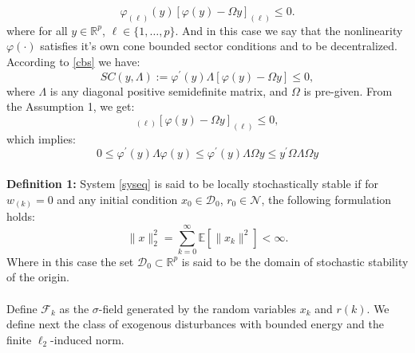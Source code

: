 \documentclass[conference]{IEEEtran}
\begin{document}
\begin{equation}\label{cbs}
\varphi_{(\ell)}(y)[\varphi(y)-\varOmega y ]_{(\ell)}\leq 0.
\end{equation}
where for all $y\in\mathbb{R}^{p}$, $\ell \in\{1,\dots,p\}$. And in this case we say that the nonlinearity $\varphi(\cdot) $ satisfies it's own cone bounded sector conditions and to be decentralized. According to \eqref{cbs} we have:
\begin{equation}\label{scieq}
	SC(y,\varLambda):= \varphi^{\mathrm{'}}(y)\varLambda[\varphi(y)-\varOmega y]\leq0,
\end{equation}
where $\varLambda$ is any diagonal positive semidefinite matrix, and $\varOmega$ is pre-given. From the Assumption 1, we get:
\begin{equation}
[\varOmega y]_{(\ell)}[\varphi(y)-\varOmega y]_{(\ell)}\leq0,
\end{equation}
which implies:
\begin{equation}
 0\leq\varphi^{\mathrm{'}}(y)\varLambda\varphi(y) \leq \varphi^{\mathrm{'}}(y)\varLambda\varOmega y \leq y^{\mathrm{'}}\varOmega\varLambda\varOmega y
\end{equation}\\
\textbf{Definition 1:} System \eqref{syseq} is said to be locally stochastically stable if for $w_(k)=0$ and any initial condition $x_0\in \mathcal{D}_0$, $r_0\in \mathcal{N}$, the following formulation holds:
\begin{equation}
	\|x\|^2_2=\sum_{k=0}^{\infty}\mathbb{E}[\|x_k\|^2]<\infty.
\end{equation} 
Where in this case the set $\mathcal{D}_0 \subset \mathbb{R}^{p}$ is said to be the domain of stochastic stability of the origin. \\
\\
Define $\mathcal{F}_k$ as the $\sigma$-field generated by the random variables $x_k$ and $r(k)$. We define next the class of exogenous disturbances with bounded energy and the finite $\ell_2$-induced              norm.
\\
\end{document}
